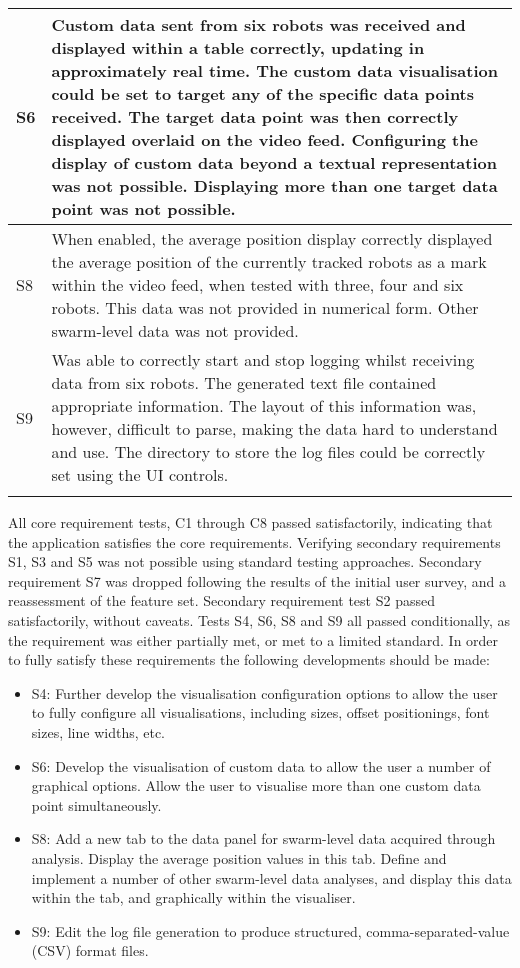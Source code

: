 \begin{longtable}{ l p{10cm} }
 S6 & Custom data sent from six robots was received and displayed within a table correctly, updating in approximately real time. The custom data visualisation could be set to target any of the specific data points received. The target data point was then correctly displayed overlaid on the video feed. Configuring the display of custom data beyond a textual representation was not possible. Displaying more than one target data point was not possible.\\\hline
 S8 & When enabled, the average position display correctly displayed the average position of the currently tracked robots as a mark within the video feed, when tested with three, four and six robots. This data was not provided in numerical form. Other swarm-level data was not provided.\\\hline
 S9 & Was able to correctly start and stop logging whilst receiving data from six robots. The generated text file contained appropriate information. The layout of this information was, however, difficult to parse, making the data hard to understand and use. The directory to store the log files could be correctly set using the UI controls.\\\hline
 \bottomrule\\
\end{longtable}

All core requirement tests, C1 through C8 passed satisfactorily, indicating that the application satisfies the core requirements. Verifying secondary requirements S1, S3 and S5 was not possible using standard testing approaches. Secondary requirement S7 was dropped following the results of the initial user survey, and a reassessment of the feature set. Secondary requirement test S2 passed satisfactorily, without caveats. Tests S4, S6, S8 and S9 all passed conditionally, as the requirement was either partially met, or met to a limited standard. In order to fully satisfy these requirements the following developments should be made:

\begin{itemize}
 \item S4: Further develop the visualisation configuration options to allow the user to fully configure all visualisations, including sizes, offset positionings, font sizes, line widths, etc.
 \item S6: Develop the visualisation of custom data to allow the user a number of graphical options. Allow the user to visualise more than one custom data point simultaneously.
 \item S8: Add a new tab to the data panel for swarm-level data acquired through analysis. Display the average position values in this tab. Define and implement a number of other swarm-level data analyses, and display this data within the tab, and graphically within the visualiser.
 \item S9: Edit the log file generation to produce structured, comma-separated-value (CSV) format files.
\end{itemize}

